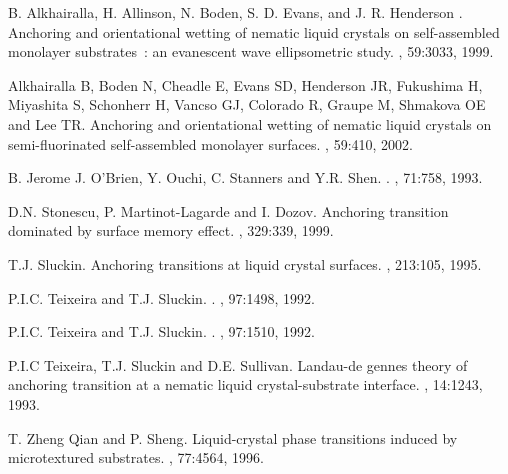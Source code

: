 \documentclass[aps,10pt,twocolumn]{revtex4}
\begin{document}
\begin{thebibliography}{10}
{B. Alkhairalla, H. Allinson, N. Boden, S. D. Evans, and J. R. Henderson }.
\newblock Anchoring and orientational wetting of nematic liquid crystals on
  self-assembled monolayer substrates~: an evanescent wave ellipsometric study.
, 59:3033, 1999.

{Alkhairalla B, Boden N, Cheadle E, Evans SD, Henderson JR, Fukushima H,
  Miyashita S, Schonherr H, Vancso GJ, Colorado R, Graupe M, Shmakova OE and
  Lee TR}.
\newblock Anchoring and orientational wetting of nematic liquid crystals on
  semi-fluorinated self-assembled monolayer surfaces.
, 59:410, 2002.

{B. Jerome J. O'Brien, Y. Ouchi, C. Stanners and Y.R. Shen}.
.
, 71:758, 1993.

{D.N. Stonescu, P. Martinot-Lagarde and I. Dozov}.
\newblock Anchoring transition dominated by surface memory effect.
, 329:339, 1999.

{T.J. Sluckin}.
\newblock Anchoring transitions at liquid crystal surfaces.
, 213:105, 1995.

{P.I.C. Teixeira and T.J. Sluckin}.
.
, 97:1498, 1992.

{P.I.C. Teixeira and T.J. Sluckin}.
.
, 97:1510, 1992.

{P.I.C Teixeira, T.J. Sluckin and D.E. Sullivan}.
\newblock Landau-de gennes theory of anchoring transition at a nematic liquid
  crystal-substrate interface.
, 14:1243, 1993.

{T. Zheng Qian and P. Sheng}.
\newblock Liquid-crystal phase transitions induced by microtextured substrates.
, 77:4564, 1996.


\end{thebibliography}
\end{document}
